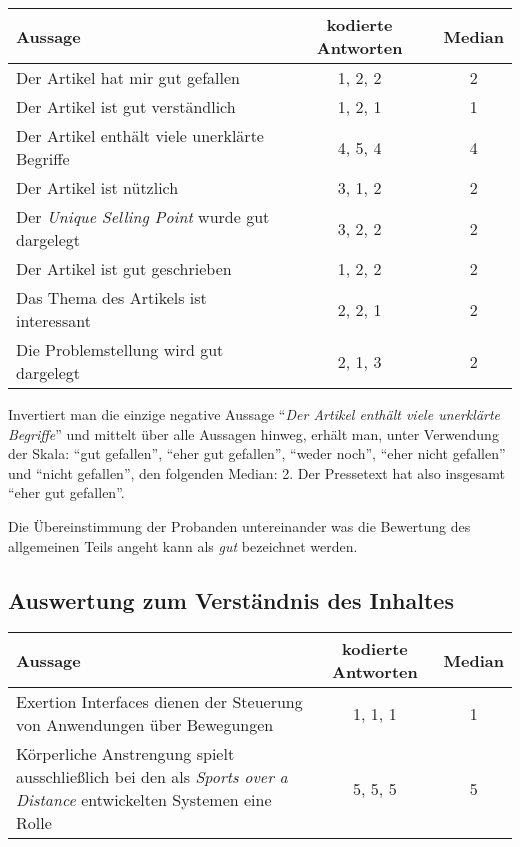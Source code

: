 \begin{table}[!ht]
    \begin{center}
        \begin{tabular}{lcc}
        \toprule
        \textbf{Aussage} & \textbf{kodierte Antworten} & \textbf{Median} \\
        \midrule
        Der Artikel hat mir gut gefallen & 1, 2, 2 & 2 \\
        Der Artikel ist gut verständlich & 1, 2, 1 & 1 \\
        Der Artikel enthält viele unerklärte Begriffe & 4, 5, 4 & 4 \\
        Der Artikel ist nützlich & 3, 1, 2 & 2 \\
        Der \emph{Unique Selling Point} wurde gut dargelegt & 3, 2, 2 & 2 \\
        Der Artikel ist gut geschrieben & 1, 2, 2 & 2 \\
        Das Thema des Artikels ist interessant & 2, 2, 1 & 2 \\
        Die Problemstellung wird gut dargelegt & 2, 1, 3 & 2 \\
        \bottomrule
        \end{tabular}
    \end{center}
\end{table}

Invertiert man die einzige negative Aussage \enquote{\emph{Der Artikel enthält
viele unerklärte Begriffe}} und mittelt über alle Aussagen hinweg, erhält man,
unter Verwendung der Skala: \enquote{gut gefallen}, \enquote{eher gut
gefallen}, \enquote{weder noch}, \enquote{eher nicht gefallen} und
\enquote{nicht gefallen}, den folgenden Median: 2.
Der Pressetext hat also insgesamt \enquote{eher gut gefallen}.

Die Übereinstimmung der Probanden untereinander was die Bewertung des
allgemeinen Teils angeht kann als \emph{gut} bezeichnet werden.


\subsection{Auswertung zum Verständnis des Inhaltes}

\begin{table}[!ht]
    \begin{center}
        \begin{tabular}{p{8cm}cc}
        \toprule
        \textbf{Aussage} & \textbf{kodierte Antworten} & \textbf{Median} \\
        \midrule
        Exertion Interfaces dienen der Steuerung von Anwendungen über Bewegungen & 1, 1, 1 & 1 \\
        \addlinespace
        Körperliche Anstrengung spielt ausschließlich bei den als \emph{Sports over a Distance} entwickelten Systemen eine Rolle & 5, 5, 5 & 5 \\
        \bottomrule
        \end{tabular}
    \end{center}
\end{table}

